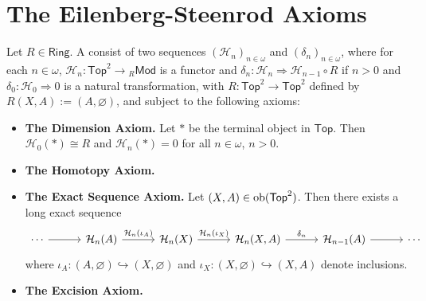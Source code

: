 \section*{The Eilenberg-Steenrod Axioms}

\begin{definition}
	Let $R \in \mathsf{Ring}$. A  consist of two sequences $(\mathcal{H}_n)_{n \in \omega}$ and $(\delta_n)_{n \in \omega}$, where for each $n \in \omega$, $\mathcal{H}_n : \mathsf{Top}^2 \to {_R}\mathsf{Mod}$ is a functor and $\delta_n : \mathcal{H}_n \Rightarrow \mathcal{H}_{n - 1} \circ R$ if $n > 0$ and $\delta_0 : \mathcal{H}_0 \Rightarrow 0$ is a natural transformation, with $R : \mathsf{Top}^2 \to \mathsf{Top}^2$ defined by $R(X,A) := (A,\varnothing)$, and subject to the following axioms:
	\begin{itemize}[wide = 0pt]
		\item \textbf{The Dimension Axiom.} Let $\ast$ be the terminal object in $\mathsf{Top}$. Then $\mathcal{H}_0(\ast) \cong R$ and $\mathcal{H}_n(\ast) = 0$ for all $n \in \omega$, $n > 0$. 
		\item \textbf{The Homotopy Axiom.} 
		\item \textbf{The Exact Sequence Axiom.} Let $(X,A) \in \operatorname{ob}(\mathsf{Top}^2)$. Then there exists a long exact sequence
			\begin{equation*}
				\begin{tikzcd}[column sep=7ex]
					\cdots \arrow[r] & \mathcal{H}_n(A) \arrow[r,"\mathcal{H}_n(\iota_A)"] & \mathcal{H}_n(X) \arrow[r,"\mathcal{H}_n(\iota_X)"] & \mathcal{H}_n(X,A) \arrow[r,"\delta_n"] & \mathcal{H}_{n - 1}(A) \arrow[r] & \cdots
				\end{tikzcd}
			\end{equation*}
			\noindent where $\iota_A : (A,\varnothing) \hookrightarrow (X,\varnothing)$ and $\iota_X : (X,\varnothing) \hookrightarrow (X,A)$ denote inclusions.
		\item \textbf{The Excision Axiom.}
	\end{itemize}
\end{definition}
